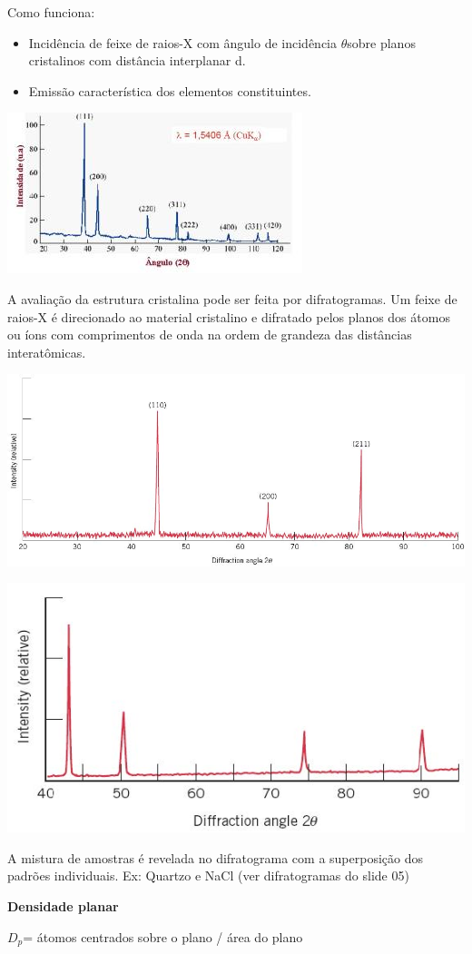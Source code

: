 Como funciona:

\begin{itemize}
	\item Incidência de feixe de raios-X com ângulo de incidência $\theta$sobre planos cristalinos com distância interplanar d.
	\item Emissão característica dos elementos constituintes.
\end{itemize}

\includegraphics[scale=0.4,trim={0 0 0 0}]{figures/difratograma}

A avaliação da estrutura cristalina pode ser feita por difratogramas. Um feixe de raios-X é direcionado ao material cristalino e difratado pelos planos dos átomos ou íons com comprimentos de onda na ordem de grandeza das distâncias interatômicas.

\includegraphics[scale=0.4,trim={0 0 0 0}]{figures/difraFe}

\includegraphics[scale=0.4,trim={0 0 0 0}]{figures/difraCu}

A mistura de amostras é revelada no difratograma com a superposição dos padrões individuais. Ex: Quartzo e NaCl (ver difratogramas do slide 05)


\textbf{Densidade planar}

$D_{p}$= átomos centrados sobre o plano / área do plano